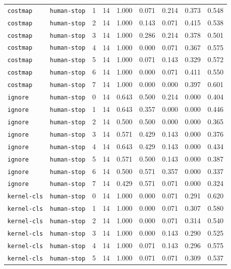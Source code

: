 \documentclass{article}
\begin{document}
\begin{center}
{\begin{tabular}{llllccccc}
\texttt{costmap} & \texttt{human-stop} & 1 & 14 & 1.000 & 0.071 & 0.214 & 0.373 & 0.548 \\
\texttt{costmap} & \texttt{human-stop} & 2 & 14 & 1.000 & 0.143 & 0.071 & 0.415 & 0.538 \\
\texttt{costmap} & \texttt{human-stop} & 3 & 14 & 1.000 & 0.286 & 0.214 & 0.378 & 0.501 \\
\texttt{costmap} & \texttt{human-stop} & 4 & 14 & 1.000 & 0.000 & 0.071 & 0.367 & 0.575 \\
\texttt{costmap} & \texttt{human-stop} & 5 & 14 & 1.000 & 0.071 & 0.143 & 0.329 & 0.572 \\
\texttt{costmap} & \texttt{human-stop} & 6 & 14 & 1.000 & 0.000 & 0.071 & 0.411 & 0.550 \\
\texttt{costmap} & \texttt{human-stop} & 7 & 14 & 1.000 & 0.000 & 0.000 & 0.397 & 0.601 \\
\texttt{ignore} & \texttt{human-stop} & 0 & 14 & 0.643 & 0.500 & 0.214 & 0.000 & 0.404 \\
\texttt{ignore} & \texttt{human-stop} & 1 & 14 & 0.643 & 0.357 & 0.000 & 0.000 & 0.446 \\
\texttt{ignore} & \texttt{human-stop} & 2 & 14 & 0.500 & 0.500 & 0.000 & 0.000 & 0.365 \\
\texttt{ignore} & \texttt{human-stop} & 3 & 14 & 0.571 & 0.429 & 0.143 & 0.000 & 0.376 \\
\texttt{ignore} & \texttt{human-stop} & 4 & 14 & 0.643 & 0.429 & 0.143 & 0.000 & 0.434 \\
\texttt{ignore} & \texttt{human-stop} & 5 & 14 & 0.571 & 0.500 & 0.143 & 0.000 & 0.387 \\
\texttt{ignore} & \texttt{human-stop} & 6 & 14 & 0.500 & 0.571 & 0.357 & 0.000 & 0.337 \\
\texttt{ignore} & \texttt{human-stop} & 7 & 14 & 0.429 & 0.571 & 0.071 & 0.000 & 0.324 \\
\texttt{kernel-cls} & \texttt{human-stop} & 0 & 14 & 1.000 & 0.000 & 0.071 & 0.291 & 0.620 \\
\texttt{kernel-cls} & \texttt{human-stop} & 1 & 14 & 1.000 & 0.000 & 0.071 & 0.307 & 0.580 \\
\texttt{kernel-cls} & \texttt{human-stop} & 2 & 14 & 1.000 & 0.000 & 0.071 & 0.314 & 0.540 \\
\texttt{kernel-cls} & \texttt{human-stop} & 3 & 14 & 1.000 & 0.000 & 0.143 & 0.290 & 0.525 \\
\texttt{kernel-cls} & \texttt{human-stop} & 4 & 14 & 1.000 & 0.071 & 0.143 & 0.296 & 0.575 \\
\texttt{kernel-cls} & \texttt{human-stop} & 5 & 14 & 1.000 & 0.071 & 0.071 & 0.309 & 0.537 \\
\bottomrule
\end{tabular}%
}
\end{center}
\end{document}
